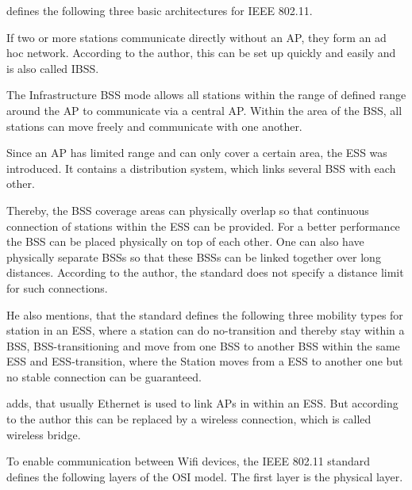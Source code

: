 \documentclass[]{nsm-thesis}
\begin{document}
\textcite{kauffels_wireless_2002} defines the following three basic architectures for IEEE 802.11.

If two or more stations communicate directly without an AP, they form an ad hoc network. According to the author, this can be set up quickly and easily and is also called \ac{IBSS}.

The Infrastructure \ac{BSS} mode allows all stations within the range of defined range around the \ac{AP} to communicate via a central \ac{AP}. Within the area of the \ac{BSS}, all stations can move freely and communicate with one another.

Since an \ac{AP} has limited range and can only cover a certain area, the \ac{ESS} was introduced. It contains a distribution system, which links several \ac{BSS} with each other.

Thereby, the BSS coverage areas can physically overlap so that continuous connection of stations within the ESS can be provided. For a better performance the \ac{BSS} can be placed physically on top of each other. One can also have physically separate \ac{BSS}s so that these \ac{BSS}s can be linked together over long distances. According to the author, the standard does not specify a distance limit for such connections. 

He also mentions, that the standard defines the following three mobility types for station in an \ac{ESS}, where a station can do no-transition and thereby stay within a \ac{BSS}, \ac{BSS}-transitioning and move from one \ac{BSS} to another \ac{BSS} within the same \ac{ESS} and \ac{ESS}-transition, where the Station moves from a \ac{ESS} to another one but no stable connection can be guaranteed.

\textcite{sauter_wireless_2022} adds, that usually Ethernet is used to link \ac{AP}s in within an \ac{ESS}. But according to the author this can be replaced by a wireless connection, which is called wireless bridge.

To enable communication between Wifi devices, the IEEE 802.11 standard defines the following layers of the OSI model. The first layer is the physical layer.











\begin{comment}
	\section{Modell für drahtlose Übertragungssysteme}
Abb 2.3.1  Modell einen Übertragungssystems
Beschränkungen und Regelungen Frequenzwahl, Sendeleistung
Analoger Kanal Störungen: thermisches Rauschen, Nebensprechen, Impulsstörungen
\fi

\end{comment}
\end{document}
